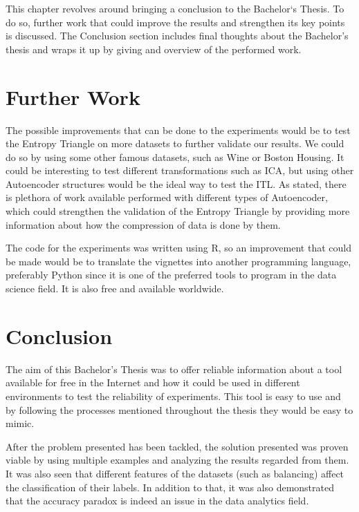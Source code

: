 This chapter revolves around bringing a conclusion to the Bachelor`s Thesis. To do so, further work that could improve the results and strengthen its key points is discussed. The Conclusion section includes final thoughts about the Bachelor's thesis and wraps it up by giving and overview of the performed work. 

\section{Further Work}

The possible improvements that can be done to the experiments would be to test the Entropy Triangle on more datasets to further validate our results. We could do so by using some other famous datasets, such as Wine or Boston Housing. It could be interesting to test different transformations such as ICA, but using other Autoencoder structures would be the ideal way to test the ITL. As stated, there is plethora of work available performed with different types of Autoencoder, which could strengthen the validation of the Entropy Triangle by providing more information about how the compression of data is done by them. \par

The code for the experiments was written using R, so an improvement that could be made would be to translate the vignettes into another programming language, preferably Python since it is one of the preferred tools to program in the data science field. It is also free and available worldwide. \par

\section{Conclusion}

The aim of this Bachelor's Thesis was to offer reliable information about a tool available for free in the Internet and how it could be used in different environments to test the reliability of experiments. This tool is easy to use and by following the processes mentioned throughout the thesis they would be easy to mimic. \par

After the problem presented has been tackled, the solution presented was proven viable by using multiple examples and analyzing the results regarded from them. It was also seen that different features of the datasets (such as balancing) affect the classification of their labels. In addition to that, it was also demonstrated that the accuracy paradox is indeed an issue in the data analytics field.

